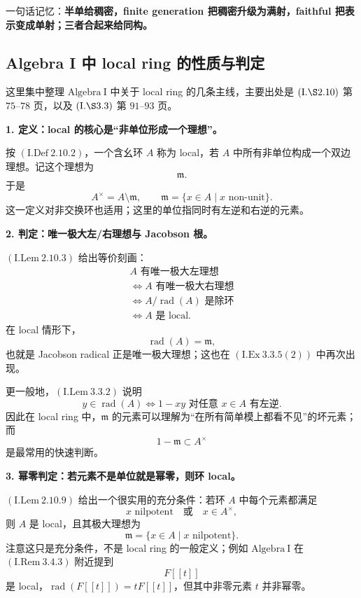 \documentclass[a4paper]{ctexart}
\theoremstyle{definition}
\theoremstyle{analysis}
\theoremstyle{plain}
\begin{document}
一句话记忆：\textbf{半单给稠密，finite generation 把稠密升级为满射，faithful 把表示变成单射；三者合起来给同构。}

\subsection{Algebra I 中 local ring 的性质与判定}\label{subsec:topic-local-ring-algebra1}

这里集中整理 \(\mathrm{Algebra\ I}\) 中关于 local ring 的几条主线，主要出处是
\((\mathrm{I.\S 2.10})\) 第 \(75\)--\(78\) 页，以及
\((\mathrm{I.\S 3.3})\) 第 \(91\)--\(93\) 页。

\medskip

\textbf{1. 定义：local 的核心是“非单位形成一个理想”。}

按 \((\mathrm{I.Def}\ 2.10.2)\)，一个含幺环 \(A\) 称为 local，若 \(A\) 中所有非单位构成一个双边理想。记这个理想为
\[
  \mathfrak m.
\]
于是
\[
  A^\times=A\setminus \mathfrak m,
  \qquad
  \mathfrak m=\{x\in A\mid x\text{ non-unit}\}.
\]
这一定义对非交换环也适用；这里的单位指同时有左逆和右逆的元素。

\medskip

\textbf{2. 判定：唯一极大左/右理想与 Jacobson 根。}

\((\mathrm{I.Lem}\ 2.10.3)\) 给出等价刻画：
\[
\begin{array}{c}
  A\text{ 有唯一极大左理想}\\
  \Longleftrightarrow
  A\text{ 有唯一极大右理想}\\
  \Longleftrightarrow
  A/\operatorname{rad}(A)\text{ 是除环}\\
  \Longleftrightarrow
  A\text{ 是 local}.
\end{array}
\]
在 local 情形下，
\[
  \operatorname{rad}(A)=\mathfrak m,
\]
也就是 Jacobson radical 正是唯一极大理想；这也在 \((\mathrm{I.Ex}\ 3.3.5(2))\) 中再次出现。

更一般地，\((\mathrm{I.Lem}\ 3.3.2)\) 说明
\[
  y\in \operatorname{rad}(A)
  \Longleftrightarrow
  1-xy\text{ 对任意 }x\in A\text{ 有左逆}.
\]
因此在 local ring 中，\(\mathfrak m\) 的元素可以理解为“在所有简单模上都看不见”的坏元素；而
\[
  1-\mathfrak m\subset A^\times
\]
是最常用的快速判断。

\medskip

\textbf{3. 幂零判定：若元素不是单位就是幂零，则环 local。}

\((\mathrm{I.Lem}\ 2.10.9)\) 给出一个很实用的充分条件：若环 \(A\) 中每个元素都满足
\[
  x\text{ nilpotent}
  \quad\text{或}\quad
  x\in A^\times,
\]
则 \(A\) 是 local，且其极大理想为
\[
  \mathfrak m=\{x\in A\mid x\text{ nilpotent}\}.
\]
注意这只是充分条件，不是 local ring 的一般定义；例如 \(\mathrm{Algebra\ I}\) 在 \((\mathrm{I.Rem}\ 3.4.3)\) 附近提到
\[
  F[[t]]
\]
是 local，\(\operatorname{rad}(F[[t]])=tF[[t]]\)，但其中非零元素 \(t\) 并非幂零。
\end{document}

